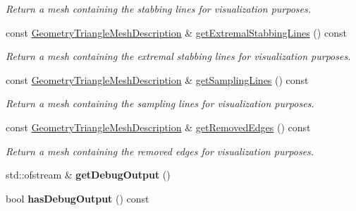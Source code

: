 \begin{DoxyCompactItemize}
\begin{DoxyCompactList}\small\item\em Return a mesh containing the stabbing lines for visualization purposes. \end{DoxyCompactList}\item 
\mbox{\label{classvisilib_1_1_helper_visual_debugger_a03fadbe9593e26b7db63ceb31ed333cc}} 
const \mbox{\hyperlink{structvisilib_1_1_geometry_triangle_mesh_description}{Geometry\+Triangle\+Mesh\+Description}} \& \mbox{\hyperlink{classvisilib_1_1_helper_visual_debugger_a03fadbe9593e26b7db63ceb31ed333cc}{get\+Extremal\+Stabbing\+Lines}} () const
\begin{DoxyCompactList}\small\item\em Return a mesh containing the extremal stabbing lines for visualization purposes. \end{DoxyCompactList}\item 
\mbox{\label{classvisilib_1_1_helper_visual_debugger_ae245f0ee5073f39aeab7c3d1fe2c641d}} 
const \mbox{\hyperlink{structvisilib_1_1_geometry_triangle_mesh_description}{Geometry\+Triangle\+Mesh\+Description}} \& \mbox{\hyperlink{classvisilib_1_1_helper_visual_debugger_ae245f0ee5073f39aeab7c3d1fe2c641d}{get\+Sampling\+Lines}} () const
\begin{DoxyCompactList}\small\item\em Return a mesh containing the sampling lines for visualization purposes. \end{DoxyCompactList}\item 
\mbox{\label{classvisilib_1_1_helper_visual_debugger_a40f4cad545c59df00d0ad3c7e4ad5565}} 
const \mbox{\hyperlink{structvisilib_1_1_geometry_triangle_mesh_description}{Geometry\+Triangle\+Mesh\+Description}} \& \mbox{\hyperlink{classvisilib_1_1_helper_visual_debugger_a40f4cad545c59df00d0ad3c7e4ad5565}{get\+Removed\+Edges}} () const
\begin{DoxyCompactList}\small\item\em Return a mesh containing the removed edges for visualization purposes. \end{DoxyCompactList}\item 
\mbox{\label{classvisilib_1_1_helper_visual_debugger_a6ec70cd2b81a389f32ab6ee0feb66095}} 
std\+::ofstream \& {\bfseries get\+Debug\+Output} ()
\item 
\mbox{\label{classvisilib_1_1_helper_visual_debugger_a7f9cdd8b04bbbcb9385a376f792a2ac2}} 
bool {\bfseries has\+Debug\+Output} () const
\end{DoxyCompactItemize}
